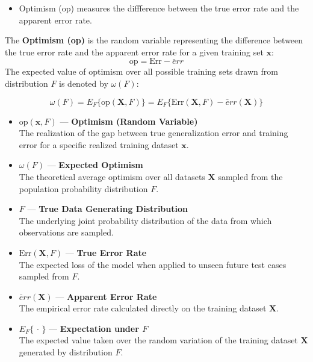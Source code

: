 \documentclass[
  letterpaper,
  DIV=11,
  numbers=noendperiod]{scrreprt}
\providecommand{\tightlist}{%
  \setlength{\itemsep}{0pt}\setlength{\parskip}{0pt}}
\begin{document}
\begin{itemize}
\tightlist
\item
  Optimism (op) measures the diffference between the true error rate and
  the apparent error rate.
\end{itemize}

\begin{tcolorbox}[enhanced jigsaw, arc=.35mm, bottomrule=.15mm, bottomtitle=1mm, breakable, colback=white, colbacktitle=quarto-callout-note-color!10!white, colframe=quarto-callout-note-color-frame, coltitle=black, left=2mm, leftrule=.75mm, opacityback=0, opacitybacktitle=0.6, rightrule=.15mm, title=\textcolor{quarto-callout-note-color}{\faInfo}\hspace{0.5em}{Definition: Optimism}, titlerule=0mm, toprule=.15mm, toptitle=1mm]

The \textbf{Optimism (op)} is the random variable representing the
difference between the true error rate and the apparent error rate for a
given training set \(\mathbf{x}\): \[
\text{op} = \text{Err} - \bar{e}rr
\] The expected value of optimism over all possible training sets drawn
from distribution \(F\) is denoted by \(\omega(F)\):

\[
\omega(F) = E_F\{\text{op}(\mathbf{X}, F)\} = E_F\big\{\text{Err}(\mathbf{X}, F) - \bar{e}rr(\mathbf{X})\big\} \tag{2.5}
\]

\begin{itemize}
\item
  \textbf{\(\text{op}(\mathbf{x}, F)\)} --- \textbf{Optimism (Random
  Variable)}\\
  The realization of the gap between true generalization error and
  training error for a specific realized training dataset
  \(\mathbf{x}\).
\item
  \textbf{\(\omega(F)\)} --- \textbf{Expected Optimism}\\
  The theoretical average optimism over all datasets \(\mathbf{X}\)
  sampled from the population probability distribution \(F\).
\item
  \textbf{\(F\)} --- \textbf{True Data Generating Distribution}\\
  The underlying joint probability distribution of the data from which
  observations are sampled.
\item
  \textbf{\(\text{Err}(\mathbf{X}, F)\)} --- \textbf{True Error Rate}\\
  The expected loss of the model when applied to unseen future test
  cases sampled from \(F\).
\item
  \textbf{\(\bar{e}rr(\mathbf{X})\)} --- \textbf{Apparent Error Rate}\\
  The empirical error rate calculated directly on the training dataset
  \(\mathbf{X}\).
\item
  \textbf{\(E_F\{\,\cdot\,\}\)} --- \textbf{Expectation under \(F\)}\\
  The expected value taken over the random variation of the training
  dataset \(\mathbf{X}\) generated by distribution \(F\).
\end{itemize}

\end{tcolorbox}
\end{document}
